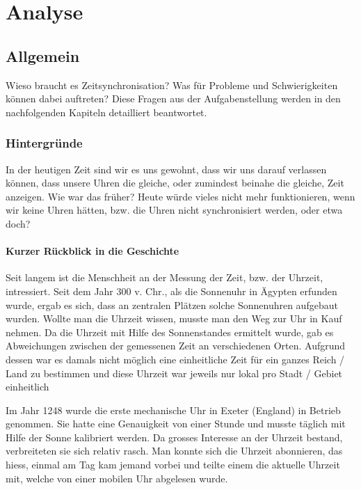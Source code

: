 
\chapter{Analyse}



\section{Allgemein}
Wieso braucht es Zeitsynchronisation? Was für Probleme und Schwierigkeiten können dabei auftreten? Diese Fragen aus der Aufgabenstellung werden in den nachfolgenden Kapiteln detailliert beantwortet.

\subsection{Hintergründe} \label{subsec:Analyse:Hintergruende}
In der heutigen Zeit sind wir es uns gewohnt, dass wir uns darauf verlassen können, dass unsere Uhren die gleiche, oder zumindest beinahe die gleiche, Zeit anzeigen. 
Wie war das früher? Heute würde vieles nicht mehr funktionieren, wenn wir keine Uhren hätten, bzw. die Uhren nicht synchronisiert werden, oder etwa doch?

\subsubsection{Kurzer Rückblick in die Geschichte} \label{subsubsec:Analyse:BlickGeschichte}
Seit langem ist die Menschheit an der Messung der Zeit, bzw. der Uhrzeit, intressiert.
Seit dem Jahr 300 v. Chr., als die Sonnenuhr in Ägypten erfunden wurde, ergab es sich, dass an zentralen Plätzen solche Sonnenuhren aufgebaut wurden. Wollte man die Uhrzeit wissen, musste man den Weg zur Uhr in Kauf nehmen.
Da die Uhrzeit mit Hilfe des Sonnenstandes ermittelt wurde, gab es Abweichungen zwischen der gemessenen Zeit an verschiedenen Orten. Aufgrund dessen war es damals nicht möglich eine einheitliche Zeit für ein ganzes Reich / Land zu bestimmen und diese Uhrzeit war jeweils nur lokal pro Stadt / Gebiet einheitlich

Im Jahr 1248 wurde die erste mechanische Uhr in Exeter (England) in Betrieb genommen. Sie hatte eine Genauigkeit von einer Stunde und musste täglich mit Hilfe der Sonne kalibriert werden.
Da grosses Interesse an der Uhrzeit bestand, verbreiteten sie sich relativ rasch.
Man konnte sich die Uhrzeit abonnieren, das hiess, einmal am Tag kam jemand vorbei und teilte einem die aktuelle Uhrzeit mit, welche von einer mobilen Uhr abgelesen wurde.

